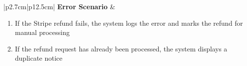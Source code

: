 \begin{table}[H]
\begin{tabular}{|p{2.7cm}|p{12.5cm}|}
        \hline
        \textbf{Error Scenario} & \begin{minipage}[t]{\linewidth}
                                      \begin{enumerate}[topsep=0pt,itemsep=1pt,parsep=0pt,partopsep=0pt,partopsep=0pt]
                                          \item If the Stripe refund fails, the system logs the error and marks the refund for
                                                manual processing
                                          \item If the refund request has already been processed, the system displays a
                                                duplicate notice
                                      \end{enumerate}
                                  \end{minipage} \\
        \hline
    \end{tabular}
    \label{tab:admin-refund}
\end{table}
